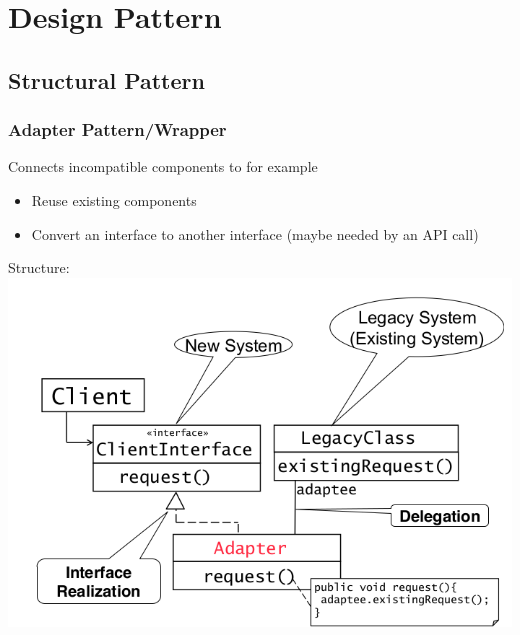 
\section{Design Pattern}


\subsection{Structural Pattern}

\subsubsection{Adapter Pattern/Wrapper}
Connects incompatible components to for example
\begin{itemize}
  \item Reuse existing components
  \item Convert an interface to another interface (maybe needed by an API call)
\end{itemize}

Structure:\\
\includegraphics[width=\linewidth]{images/pattern_adapter.png}
\newpage

